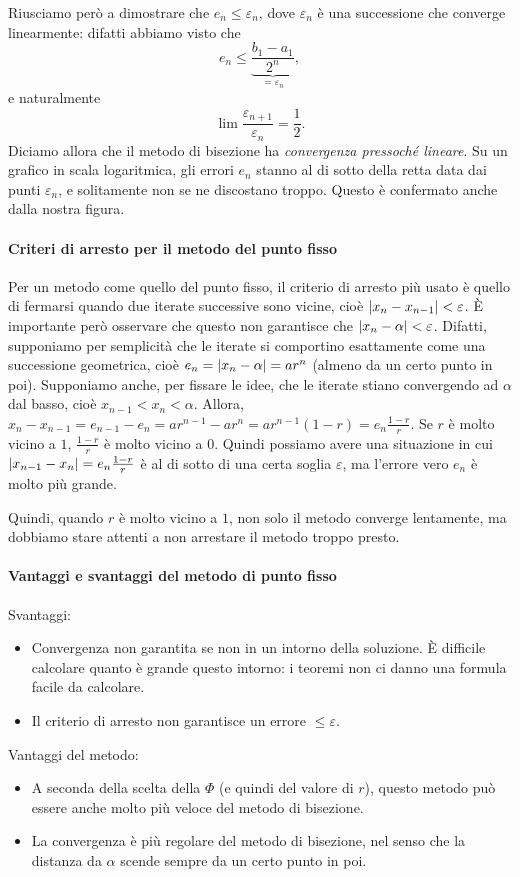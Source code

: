 \documentclass[a4paper]{report}
\DeclarePairedDelimiter{\abs}{\lvert}{\rvert}
\theoremstyle{definiton}
\theoremstyle{remark}
\begin{document}
Riusciamo però a dimostrare che $e_n \leq \varepsilon_n$, dove $\varepsilon_n$ è una successione che converge linearmente: difatti abbiamo visto che
\[
e_n \leq \underbrace{\frac{b_1 - a_1}{2^n}}_{=\varepsilon_n},
\]
e naturalmente
\[
\lim \frac{\varepsilon_{n+1}}{\varepsilon_n} = \frac{1}{2}.
\]
Diciamo allora che il metodo di bisezione ha \emph{convergenza pressoché lineare}. Su un grafico in scala logaritmica, gli errori $e_n$ stanno al di sotto della retta data dai punti $\varepsilon_n$, e solitamente non se ne discostano troppo. Questo è confermato anche dalla nostra figura.

\paragraph{Criteri di arresto per il metodo del punto fisso}

Per un metodo come quello del punto fisso, il criterio di arresto più usato è quello di fermarsi quando due iterate successive sono vicine, cioè $\abs{x_{n} - x_{n-1}} < \varepsilon$. È importante però osservare che questo non garantisce che $\abs{x_n - \alpha} < \varepsilon$. Difatti, supponiamo per semplicità che le iterate si comportino esattamente come una successione geometrica, cioè $e_n = \abs{x_n-\alpha} = ar^n$ (almeno da un certo punto in poi). Supponiamo anche, per fissare le idee, che le iterate stiano convergendo ad $\alpha$ dal basso, cioè $x_{n-1} < x_{n} < \alpha$. Allora, $x_{n} - x_{n-1} = e_{n-1} - e_n = ar^{n-1} - ar^n = ar^{n-1}(1-r) = e_n \frac{1-r}{r}$. Se $r$ è molto vicino a $1$, $\frac{1-r}{r}$ è molto vicino a $0$. Quindi possiamo avere una situazione in cui $\abs{x_{n-1}-x_n} = e_n \frac{1-r}{r}$ è al di sotto di una certa soglia $\varepsilon$, ma l'errore vero $e_n$ è molto più grande.

Quindi, quando $r$ è molto vicino a $1$, non solo il metodo converge lentamente, ma dobbiamo stare attenti a non arrestare il metodo troppo presto.

\paragraph{Vantaggi e svantaggi del metodo di punto fisso}

Svantaggi:
\begin{itemize}
    \item Convergenza non garantita se non in un intorno della soluzione. È difficile calcolare quanto è grande questo intorno: i teoremi non ci danno una formula facile da calcolare.
    \item Il criterio di arresto non garantisce un errore $\leq \varepsilon$.
\end{itemize}
Vantaggi del metodo:
\begin{itemize}
    \item A seconda della scelta della $\Phi$ (e quindi del valore di $r$), questo metodo può essere anche molto più veloce del metodo di bisezione.
    \item La convergenza è più regolare del metodo di bisezione, nel senso che la distanza da $\alpha$ scende sempre da un certo punto in poi. 
\end{itemize}
\end{document}
